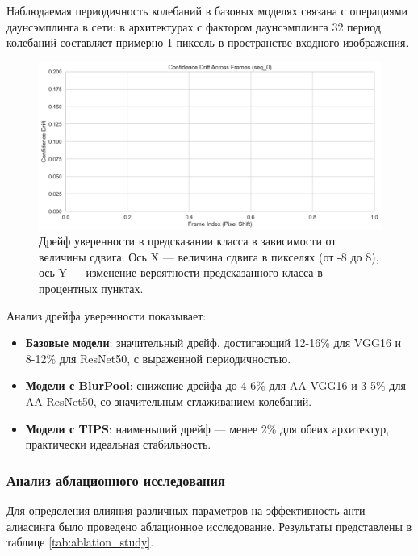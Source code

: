 Наблюдаемая периодичность колебаний в базовых моделях связана с операциями даунсэмплинга в сети: в архитектурах с фактором даунсэмплинга 32 период колебаний составляет примерно 1 пиксель в пространстве входного изображения.

\begin{figure}[ht]
\centering
\includegraphics[width=\textwidth]{images/classification/confidence_drift_comparison_seq_0.png}
\caption{Дрейф уверенности в предсказании класса в зависимости от величины сдвига. Ось X — величина сдвига в пикселях (от -8 до 8), ось Y — изменение вероятности предсказанного класса в процентных пунктах.}
\label{fig:confidence_drift}
\end{figure}

Анализ дрейфа уверенности показывает:

\begin{itemize}
    \item \textbf{Базовые модели}: значительный дрейф, достигающий 12-16\% для VGG16 и 8-12\% для ResNet50, с выраженной периодичностью.
    
    \item \textbf{Модели с BlurPool}: снижение дрейфа до 4-6\% для AA-VGG16 и 3-5\% для AA-ResNet50, со значительным сглаживанием колебаний.
    
    \item \textbf{Модели с TIPS}: наименьший дрейф — менее 2\% для обеих архитектур, практически идеальная стабильность.
\end{itemize}

\subsubsection{Анализ аблационного исследования}
\label{sec:experiments:classification:ablation}

Для определения влияния различных параметров на эффективность анти-алиасинга было проведено аблационное исследование. Результаты представлены в таблице \ref{tab:ablation_study}.

